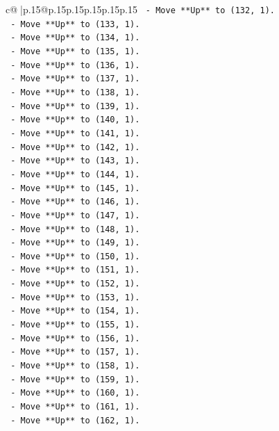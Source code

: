 \documentclass{article}
\begin{document}
{\begin{supertabular}{c@{$\;$}|p{.15\linewidth}@{}p{.15\linewidth}p{.15\linewidth}p{.15\linewidth}p{.15\linewidth}p{.15\linewidth}}
{{{\texttt{    {-} Move **Up** to (132, 1).} \\
\texttt{    {-} Move **Up** to (133, 1).} \\
\texttt{    {-} Move **Up** to (134, 1).} \\
\texttt{    {-} Move **Up** to (135, 1).} \\
\texttt{    {-} Move **Up** to (136, 1).} \\
\texttt{    {-} Move **Up** to (137, 1).} \\
\texttt{    {-} Move **Up** to (138, 1).} \\
\texttt{    {-} Move **Up** to (139, 1).} \\
\texttt{    {-} Move **Up** to (140, 1).} \\
\texttt{    {-} Move **Up** to (141, 1).} \\
\texttt{    {-} Move **Up** to (142, 1).} \\
\texttt{    {-} Move **Up** to (143, 1).} \\
\texttt{    {-} Move **Up** to (144, 1).} \\
\texttt{    {-} Move **Up** to (145, 1).} \\
\texttt{    {-} Move **Up** to (146, 1).} \\
\texttt{    {-} Move **Up** to (147, 1).} \\
\texttt{    {-} Move **Up** to (148, 1).} \\
\texttt{    {-} Move **Up** to (149, 1).} \\
\texttt{    {-} Move **Up** to (150, 1).} \\
\texttt{    {-} Move **Up** to (151, 1).} \\
\texttt{    {-} Move **Up** to (152, 1).} \\
\texttt{    {-} Move **Up** to (153, 1).} \\
\texttt{    {-} Move **Up** to (154, 1).} \\
\texttt{    {-} Move **Up** to (155, 1).} \\
\texttt{    {-} Move **Up** to (156, 1).} \\
\texttt{    {-} Move **Up** to (157, 1).} \\
\texttt{    {-} Move **Up** to (158, 1).} \\
\texttt{    {-} Move **Up** to (159, 1).} \\
\texttt{    {-} Move **Up** to (160, 1).} \\
\texttt{    {-} Move **Up** to (161, 1).} \\
\texttt{    {-} Move **Up** to (162, 1).} \\
}}}
\end{supertabular}}
\end{document}
